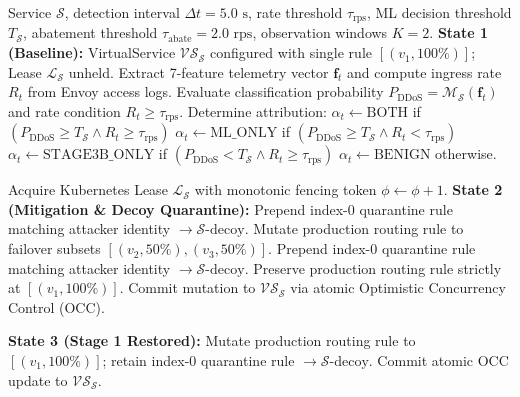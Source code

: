 \begin{algorithm}[!t]
\caption{Decentralized Concurrent Mitigation and Two-Stage Autonomous Recovery}
\label{alg:scenario5_recovery}
\begin{algorithmic}[1]
\Require Service $\mathcal{S}$, detection interval $\Delta t = 5.0\text{ s}$, rate threshold $\tau_{\text{rps}}$, ML decision threshold $T_{\mathcal{S}}$, abatement threshold $\tau_{\text{abate}} = 2.0\text{ rps}$, observation windows $K=2$.
\State \textbf{State 1 (Baseline):} VirtualService $\mathcal{VS}_{\mathcal{S}}$ configured with single rule $[(v_1, 100\%)]$; Lease $\mathcal{L}_{\mathcal{S}}$ unheld.
    \State Extract 7-feature telemetry vector $\mathbf{f}_t$ and compute ingress rate $R_t$ from Envoy access logs.
    \State Evaluate classification probability $P_{\text{DDoS}} = \mathcal{M}_{\mathcal{S}}(\mathbf{f}_t)$ and rate condition $R_t \ge \tau_{\text{rps}}$.
    \State Determine attribution:
    \State \quad $\alpha_t \leftarrow \text{BOTH}$ if $(P_{\text{DDoS}} \ge T_{\mathcal{S}} \land R_t \ge \tau_{\text{rps}})$
    \State \quad $\alpha_t \leftarrow \text{ML\_ONLY}$ if $(P_{\text{DDoS}} \ge T_{\mathcal{S}} \land R_t < \tau_{\text{rps}})$
    \State \quad $\alpha_t \leftarrow \text{STAGE3B\_ONLY}$ if $(P_{\text{DDoS}} < T_{\mathcal{S}} \land R_t \ge \tau_{\text{rps}})$
    \State \quad $\alpha_t \leftarrow \text{BENIGN}$ otherwise.
    
        \State Acquire Kubernetes Lease $\mathcal{L}_{\mathcal{S}}$ with monotonic fencing token $\phi \leftarrow \phi + 1$.
        \State \textbf{State 2 (Mitigation \& Decoy Quarantine):}
            \State Prepend index-0 quarantine rule matching attacker identity $\to \mathcal{S}\text{-decoy}$.
            \State Mutate production routing rule to failover subsets $[(v_2, 50\%), (v_3, 50\%)]$.
        \Else {}
            \State Prepend index-0 quarantine rule matching attacker identity $\to \mathcal{S}\text{-decoy}$.
            \State Preserve production routing rule strictly at $[(v_1, 100\%)]$.
        \EndIf
        \State Commit mutation to $\mathcal{VS}_{\mathcal{S}}$ via atomic Optimistic Concurrency Control (OCC).
    \EndIf

        \State {}
            \State \textbf{State 3 (Stage 1 Restored):}
            \State Mutate production routing rule to $[(v_1, 100\%)]$; retain index-0 quarantine rule $\to \mathcal{S}\text{-decoy}$.
            \State Commit atomic OCC update to $\mathcal{VS}_{\mathcal{S}}$.
        \EndIf


\end{algorithmic}
\end{algorithm}
